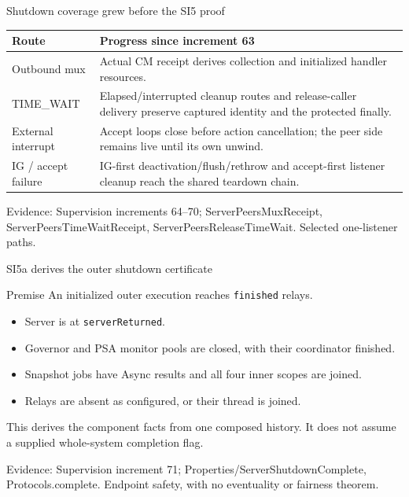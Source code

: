 \documentclass[11pt,aspectratio=169]{beamer}
\newcommand{\evidence}[1]{\vfill{\fontsize{7}{8}\selectfont\color{Muted}Evidence: #1\par}}
\begin{document}
\begin{frame}{Shutdown coverage grew before the SI5 proof}
\small\renewcommand{\arraystretch}{1.2}
\begin{tabularx}{\textwidth}{@{}P{28mm}Y@{}}
\toprule
Route & Progress since increment 63 \\ \midrule
Outbound mux & Actual CM receipt derives collection and initialized handler resources. \\[2mm]
TIME\_WAIT & Elapsed/interrupted cleanup routes and release-caller delivery preserve captured identity and the protected finally. \\[2mm]
External interrupt & Accept loops close before action cancellation; the peer side remains live until its own unwind. \\[2mm]
IG / accept failure & IG-first deactivation/flush/rethrow and accept-first listener cleanup reach the shared teardown chain. \\[2mm]
\bottomrule
\end{tabularx}
\evidence{Supervision increments 64--70; ServerPeersMuxReceipt, ServerPeersTimeWaitReceipt, ServerPeersReleaseTimeWait. Selected one-listener paths.}
\end{frame}

\begin{frame}{SI5a derives the outer shutdown certificate}
\begin{block}{Premise}
An initialized outer execution reaches \texttt{finished} relays.
\end{block}\begin{itemize}\setlength\itemsep{2.5mm}
\item Server is at \texttt{serverReturned}.
\item Governor and PSA monitor pools are closed, with their coordinator finished.
\item Snapshot jobs have Async results and all four inner scopes are joined.
\item Relays are absent as configured, or their thread is joined.
\end{itemize}\small This derives the component facts from one composed history. It does not assume a supplied whole-system completion flag.
\evidence{Supervision increment 71; Properties/ServerShutdownComplete, Protocols.complete. Endpoint safety, with no eventuality or fairness theorem.}
\end{frame}
\end{document}
